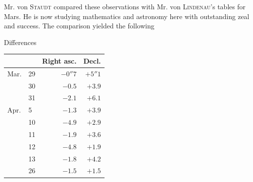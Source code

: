 Mr. von \textsc{Staudt} compared these observations with Mr. von \textsc{Lindenau}’s tables for Mars. He is now studying mathematics and astronomy here with outstanding zeal and success. The comparison yielded the following

\begin{center}
Differences

\begin{tabular}{ll|r|r}
 & & Right asc. & Decl. \\
\hline
Mar. & 29 & $-0''7$ & $+5''1$ \\
 & 30 & $-0.5$ & $+3.9$ \\
 & 31 & $-2.1$ & $+6.1$ \\
Apr. & 5 & $-1.3$ & $+3.9$ \\
 & 10 & $-4.9$ & $+2.9$ \\
 & 11 & $-1.9$ & $+3.6$ \\
 & 12 & $-4.8$ & $+1.9$ \\
 & 13 & $-1.8$ & $+4.2$ \\
 & 26 & $-1.5$ & $+1.5$ \\
\end{tabular}
\end{center}
